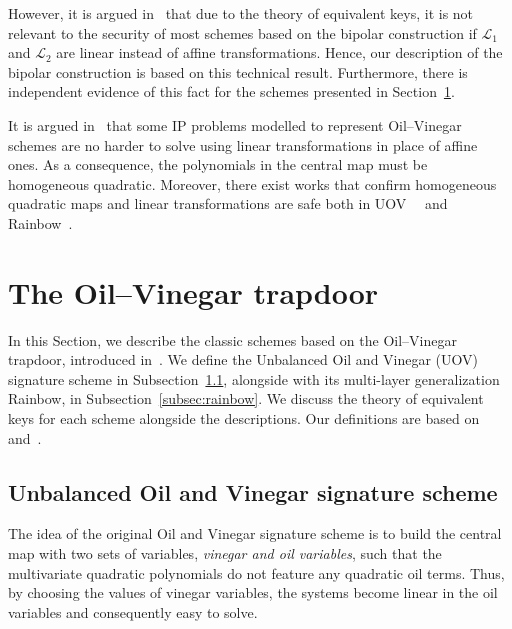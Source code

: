 \documentclass[12pt, a4paper, oneside]{memoir}
\theoremstyle{definition}
\begin{document}
However, it is argued in~\cite[Remark 3.1]{Wolf:201104} that due to the theory of equivalent keys, it is not relevant to the security of most schemes based on the bipolar construction if $\mathcal{L}_{1}$ and $\mathcal{L}_{2}$ are linear instead of affine transformations. Hence, our description of the bipolar construction is based on this technical result. Furthermore, there is independent evidence of this fact for the schemes presented in Section~\ref{sec:ov}. 

It is argued in~\cite[Lemmata 3.2, 3.10, 3.19]{Thomae:201306} that some IP problems modelled to represent Oil--Vinegar schemes are no harder to solve using linear transformations in place of affine ones. As a consequence, the polynomials in the central map must be homogeneous quadratic. Moreover, there exist works that confirm homogeneous quadratic maps and linear transformations are safe both in UOV~\cite[Section 5]{Kipnis:199808}~\cite[Section 3.1]{Braeken:200502} and Rainbow~\cite[Section 3.1]{Ding:201901}.

\section{The Oil--Vinegar trapdoor}\label{sec:ov}

In this Section, we describe the classic schemes based on the Oil--Vinegar trapdoor, introduced in~\cite{Patarin:199709}. We define the Unbalanced Oil and Vinegar (UOV) signature scheme in Subsection~\ref{subsec:uov}, alongside with its multi-layer generalization Rainbow, in Subsection~\ref{subsec:rainbow}. We discuss the theory of equivalent keys for each scheme alongside the descriptions. Our definitions are based on~\cite[Chapter 3]{Ding:2006} and~\cite[Chapter 3]{Petzoldt:201307}.

\subsection{Unbalanced Oil and Vinegar signature scheme}\label{subsec:uov}

The idea of the original Oil and Vinegar signature scheme is to build the central map with two sets of variables, \emph{vinegar and oil variables}, such that the multivariate quadratic polynomials do not feature any quadratic oil terms. Thus, by choosing the values of vinegar variables, the systems become linear in the oil variables and consequently easy to solve.
\end{document}
